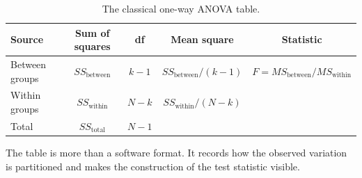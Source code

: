 \begin{table}[htbp]
\centering
\caption{The classical one-way ANOVA table.}
\label{tab:anova-table-general}
\begin{tabular}{@{}lcccc@{}}
\toprule
Source & Sum of squares & df & Mean square & Statistic \\
\midrule
Between groups
& $SS_{\text{between}}$
& $k-1$
& $SS_{\text{between}}/(k-1)$
& $F=MS_{\text{between}}/MS_{\text{within}}$ \\
Within groups
& $SS_{\text{within}}$
& $N-k$
& $SS_{\text{within}}/(N-k)$
& \\
Total
& $SS_{\text{total}}$
& $N-1$
&
& \\
\bottomrule
\end{tabular}
\end{table}

The table is more than a software format. It records how the observed variation is partitioned and makes the construction of the test statistic visible.

\newpage

